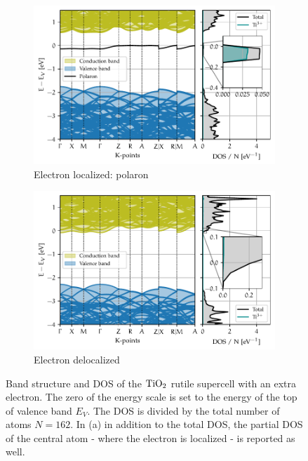 \begin{figure}
    \centering
    \begin{subfigure}[b]{\textwidth}
        \centering
        \includegraphics[width=\textwidth]{figures/polaron}
        \caption{Electron localized: polaron}
        \label{fig:polaron_bands}
    \end{subfigure}
    \hfill
    \begin{subfigure}[b]{\textwidth}
        \centering
        \includegraphics[width=\textwidth]{figures/deloc}
        \caption{Electron delocalized}
        \label{fig:delocalized_bands}
    \end{subfigure}
    \caption[Band structure and DOS of the $\ce{TiO_2}$ rutile supercell with an extra electron]{Band structure and DOS of the $\ce{TiO_2}$ rutile supercell with an extra electron. The zero of the energy scale is set to the energy of the top of valence band $E_V$. The DOS is divided by the total number of atoms $N = 162$. In (a) in addition to the total DOS, the partial DOS of the central atom - where the electron is localized - is reported as well.}
    \label{fig:bands_super_extra}
\end{figure}

